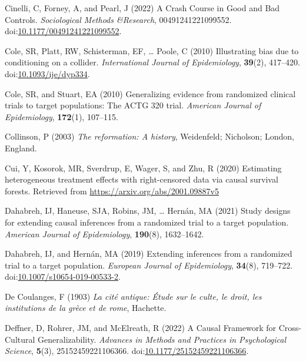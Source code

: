 \documentclass[
  singlecolumn]{article}
\newlength{\cslhangindent}
\newenvironment{CSLReferences}[2] %
 {\begin{list}{}{%
  \setlength{\itemindent}{0pt}
  \setlength{\leftmargin}{0pt}
  \setlength{\parsep}{0pt}
  \ifodd #1
   \setlength{\leftmargin}{\cslhangindent}
   \setlength{\itemindent}{-1\cslhangindent}
  \fi
  \setlength{\itemsep}{#2\baselineskip}}}
 {\end{list}}
\begin{document}
\begin{CSLReferences}{1}{0}
Cinelli, C, Forney, A, and Pearl, J (2022) A Crash Course in Good and
Bad Controls. \emph{Sociological Methods \&Research}, 00491241221099552.
doi:\href{https://doi.org/10.1177/00491241221099552}{10.1177/00491241221099552}.

Cole, SR, Platt, RW, Schisterman, EF, \ldots{} Poole, C (2010)
Illustrating bias due to conditioning on a collider. \emph{International
Journal of Epidemiology}, \textbf{39}(2), 417--420.
doi:\href{https://doi.org/10.1093/ije/dyp334}{10.1093/ije/dyp334}.

Cole, SR, and Stuart, EA (2010) Generalizing evidence from randomized
clinical trials to target populations: The ACTG 320 trial.
\emph{American Journal of Epidemiology}, \textbf{172}(1), 107--115.

Collinson, P (2003) \emph{The reformation: A history}, Weidenfeld;
Nicholson; London, England.

Cui, Y, Kosorok, MR, Sverdrup, E, Wager, S, and Zhu, R (2020) Estimating
heterogeneous treatment effects with right-censored data via causal
survival forests. Retrieved from
\url{https://arxiv.org/abs/2001.09887v5}

Dahabreh, IJ, Haneuse, SJA, Robins, JM, \ldots{} Hernán, MA (2021) Study
designs for extending causal inferences from a randomized trial to a
target population. \emph{American Journal of Epidemiology},
\textbf{190}(8), 1632--1642.

Dahabreh, IJ, and Hernán, MA (2019) Extending inferences from a
randomized trial to a target population. \emph{European Journal of
Epidemiology}, \textbf{34}(8), 719--722.
doi:\href{https://doi.org/10.1007/s10654-019-00533-2}{10.1007/s10654-019-00533-2}.

De Coulanges, F (1903) \emph{La cité antique: Étude sur le culte, le
droit, les institutions de la grèce et de rome}, Hachette.

Deffner, D, Rohrer, JM, and McElreath, R (2022) A Causal Framework for
Cross-Cultural Generalizability. \emph{Advances in Methods and Practices
in Psychological Science}, \textbf{5}(3), 25152459221106366.
doi:\href{https://doi.org/10.1177/25152459221106366}{10.1177/25152459221106366}.


\end{CSLReferences}
\end{document}
